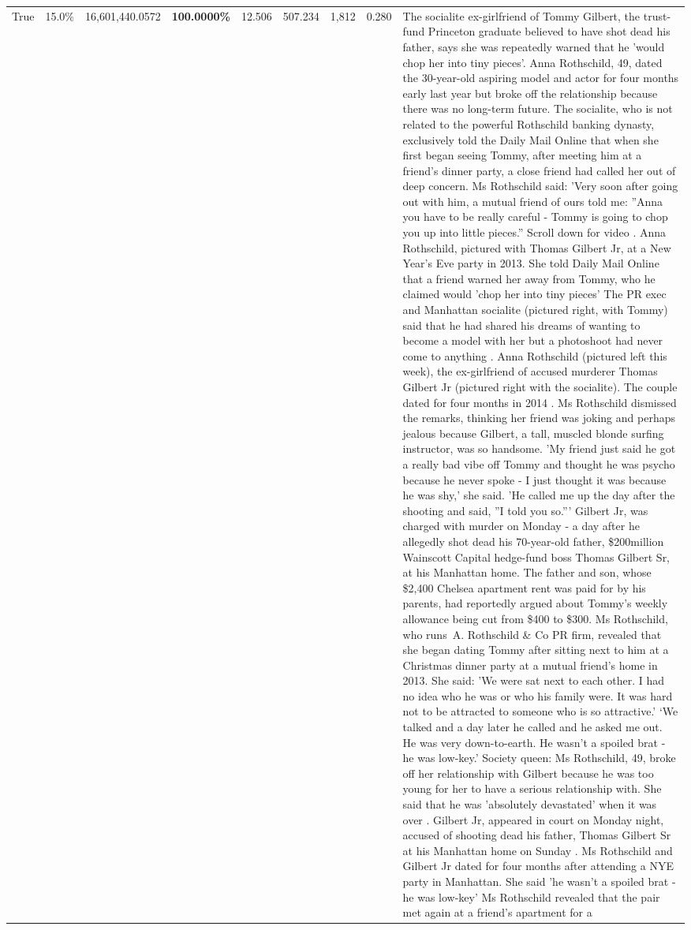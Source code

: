 \begin{table}[H]
\begin{tabular}{lllrlllll}
True & 15.0\% & 16,601,440.0572 & \bfseries \color{red} 100.0000\% & 12.506 & 507.234 & 1,812 & 0.280 & The socialite ex-girlfriend of Tommy Gilbert, the trust-fund Princeton graduate believed to have shot dead his father, says she was repeatedly warned that he 'would chop her into tiny pieces'. Anna Rothschild, 49, dated the 30-year-old aspiring model and actor for four months early last year but broke off the relationship because there was no long-term future. The socialite, who is not related to the powerful Rothschild banking dynasty, exclusively told the Daily Mail Online that when she first began seeing Tommy, after meeting him at a friend's dinner party, a close friend had called her out of deep concern. Ms Rothschild said: 'Very soon after going out with him, a mutual friend of ours told me: ''Anna you have to be really careful - Tommy is going to chop you up into little pieces.'' Scroll down for video . Anna Rothschild, pictured with Thomas Gilbert Jr, at a New Year's Eve party in 2013. She told Daily Mail Online that a friend warned her away from Tommy, who he claimed would 'chop her into tiny pieces' The PR exec and Manhattan socialite (pictured right, with Tommy) said that he had shared his dreams of wanting to become a model with her but a photoshoot had never come to anything . Anna Rothschild (pictured left this week), the ex-girlfriend of accused murderer Thomas Gilbert Jr (pictured right with the socialite). The couple dated for four months in 2014 . Ms Rothschild dismissed the remarks, thinking her friend was joking and perhaps jealous because Gilbert, a tall, muscled blonde surfing instructor, was so handsome. 'My friend just said he got a really bad vibe off Tommy and thought he was psycho because he never spoke - I just thought it was because he was shy,' she said. 'He called me up the day after the shooting and said, ''I told you so.''' Gilbert Jr, was charged with murder on Monday - a day after he allegedly shot dead his 70-year-old father, \$200million Wainscott Capital hedge-fund boss Thomas Gilbert Sr, at his Manhattan home. The father and son, whose \$2,400 Chelsea apartment rent was paid for by his parents, had reportedly argued about Tommy's weekly allowance being cut from \$400 to \$300. Ms Rothschild, who runs A. Rothschild \& Co PR firm, revealed that she began dating Tommy after sitting next to him at a Christmas dinner party at a mutual friend's home in 2013. She said: 'We were sat next to each other. I had no idea who he was or who his family were. It was hard not to be attracted to someone who is so attractive.' ‘We talked and a day later he called and he asked me out. He was very down-to-earth. He wasn’t a spoiled brat - he was low-key.’ Society queen: Ms Rothschild, 49, broke off her relationship with Gilbert because he was too young for her to have a serious relationship with. She said that he was 'absolutely devastated' when it was over . Gilbert Jr, appeared in court on Monday night, accused of shooting dead his father, Thomas Gilbert Sr at his Manhattan home on Sunday . Ms Rothschild and Gilbert Jr dated for four months after attending a NYE party in Manhattan. She said 'he wasn't a spoiled brat - he was low-key' Ms Rothschild revealed that the pair met again at a friend’s apartment for a 
\end{tabular}
\end{table}
